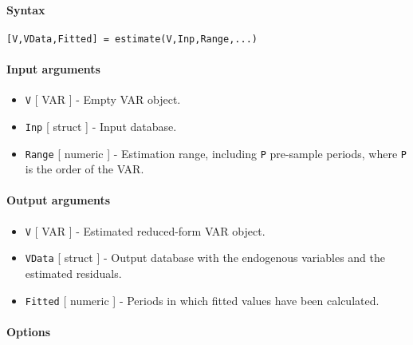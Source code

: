 


	\paragraph{Syntax}

\begin{verbatim}
[V,VData,Fitted] = estimate(V,Inp,Range,...)
\end{verbatim}

\paragraph{Input arguments}

\begin{itemize}
\item
  \texttt{V} {[} VAR {]} - Empty VAR object.
\item
  \texttt{Inp} {[} struct {]} - Input database.
\item
  \texttt{Range} {[} numeric {]} - Estimation range, including
  \texttt{P} pre-sample periods, where \texttt{P} is the order of the
  VAR.
\end{itemize}

\paragraph{Output arguments}

\begin{itemize}
\item
  \texttt{V} {[} VAR {]} - Estimated reduced-form VAR object.
\item
  \texttt{VData} {[} struct {]} - Output database with the endogenous
  variables and the estimated residuals.
\item
  \texttt{Fitted} {[} numeric {]} - Periods in which fitted values have
  been calculated.
\end{itemize}

\paragraph{Options}

